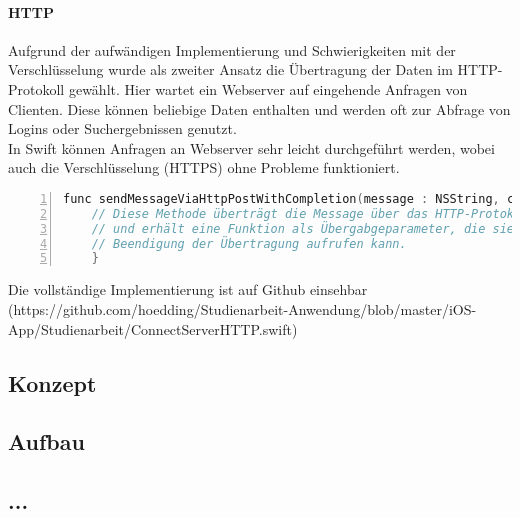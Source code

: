 \paragraph{HTTP}
Aufgrund der aufwändigen Implementierung und Schwierigkeiten mit der Verschlüsselung wurde als zweiter Ansatz die Übertragung der Daten im HTTP-Protokoll gewählt. Hier wartet ein Webserver auf eingehende Anfragen von Clienten. Diese können beliebige Daten enthalten und werden oft zur Abfrage von Logins oder Suchergebnissen genutzt. \\
In Swift können Anfragen an Webserver sehr leicht durchgeführt werden, wobei auch die Verschlüsselung (HTTPS) ohne Probleme funktioniert. 

\begin{lstlisting}[caption =Implementierung der Übertragung mittels HTTP in Swift, language=C, frame=single, breaklines=true,columns=fullflexible, commentstyle=\color{gray}\upshape, captionpos=b, numbers = left]
    func sendMessageViaHttpPostWithCompletion(message : NSString, completionClosure : (s : NSString) -> ()) {
	// Diese Methode überträgt die Message über das HTTP-Protokoll
	// und erhält eine Funktion als Übergabgeparameter, die sie nach 
	// Beendigung der Übertragung aufrufen kann. 
    }
\end{lstlisting}
Die vollständige Implementierung ist auf Github einsehbar (https://github.com/hoedding/Studienarbeit-Anwendung/blob/master/iOS-App/Studienarbeit/ConnectServerHTTP.swift)
\subsection{Konzept}
\subsection{Aufbau}
\subsection{...}